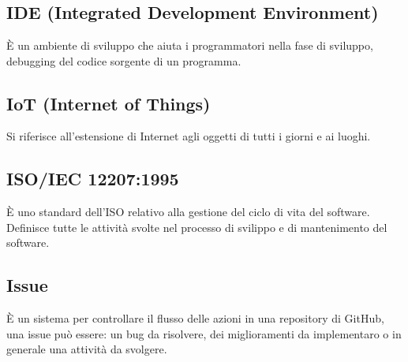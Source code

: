 \section{}
\subsection*{IDE (Integrated Development Environment)} È un ambiente di sviluppo che aiuta i programmatori nella fase di sviluppo, debugging del codice sorgente di un programma.

\subsection*{IoT (Internet of Things)} Si riferisce all'estensione di Internet agli oggetti di tutti i giorni e ai luoghi.

\subsection*{ISO/IEC 12207:1995} È uno standard dell'ISO relativo alla gestione del ciclo di vita del software. Definisce tutte le attività svolte nel processo di svilippo e di mantenimento del software.

\subsection*{Issue} È un sistema per controllare il flusso delle azioni in una repository di GitHub, una issue può essere: un bug da risolvere, dei miglioramenti da implementaro o in generale una attività da svolgere.
